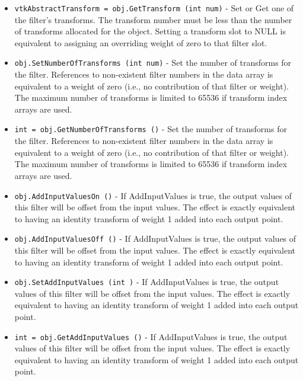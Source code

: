 \begin{itemize}
\item  \verb|vtkAbstractTransform = obj.GetTransform (int num)| -  Set or Get one of the filter's transforms. The transform number must
 be less than the number of transforms allocated for the object.  Setting
 a transform slot to NULL is equivalent to assigning an overriding weight
 of zero to that filter slot.

\item  \verb|obj.SetNumberOfTransforms (int num)| -  Set the number of transforms for the filter.  References to non-existent
 filter numbers in the data array is equivalent to a weight of zero
 (i.e., no contribution of that filter or weight).  The maximum number of 
 transforms is limited to 65536 if transform index arrays are used.

\item  \verb|int = obj.GetNumberOfTransforms ()| -  Set the number of transforms for the filter.  References to non-existent
 filter numbers in the data array is equivalent to a weight of zero
 (i.e., no contribution of that filter or weight).  The maximum number of 
 transforms is limited to 65536 if transform index arrays are used.

\item  \verb|obj.AddInputValuesOn ()| -  If AddInputValues is true, the output values of this filter will be
 offset from the input values.  The effect is exactly equivalent to
 having an identity transform of weight 1 added into each output point.

\item  \verb|obj.AddInputValuesOff ()| -  If AddInputValues is true, the output values of this filter will be
 offset from the input values.  The effect is exactly equivalent to
 having an identity transform of weight 1 added into each output point.

\item  \verb|obj.SetAddInputValues (int )| -  If AddInputValues is true, the output values of this filter will be
 offset from the input values.  The effect is exactly equivalent to
 having an identity transform of weight 1 added into each output point.

\item  \verb|int = obj.GetAddInputValues ()| -  If AddInputValues is true, the output values of this filter will be
 offset from the input values.  The effect is exactly equivalent to
 having an identity transform of weight 1 added into each output point.

\end{itemize}
